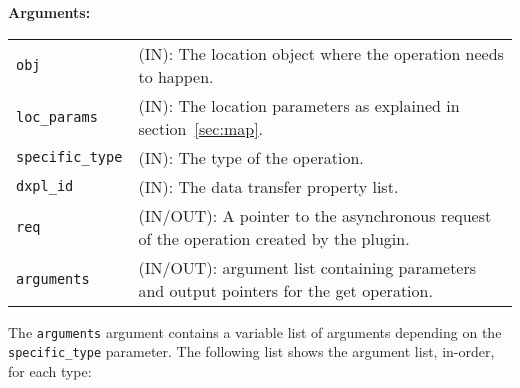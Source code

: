 \textbf{Arguments:}\\
\begin{tabular}{l p{10cm}}
  {\tt obj} & (IN): The location object  where the operation needs to happen.\\
  {\tt loc\_params} & (IN): The location parameters as explained in section~\ref{sec:map}.\\
  {\tt specific\_type} & (IN): The type of the operation.\\
  {\tt dxpl\_id} & (IN): The data transfer property list.\\
  {\tt req} & (IN/OUT): A pointer to the asynchronous request of the
  operation created by the plugin.\\
  {\tt arguments} & (IN/OUT): argument list containing parameters and
  output pointers for the get operation. \\
\end{tabular}

The {\tt arguments} argument contains a variable list of arguments
depending on the {\tt specific\_type} parameter. The following list shows
the argument list, in-order, for each type:

